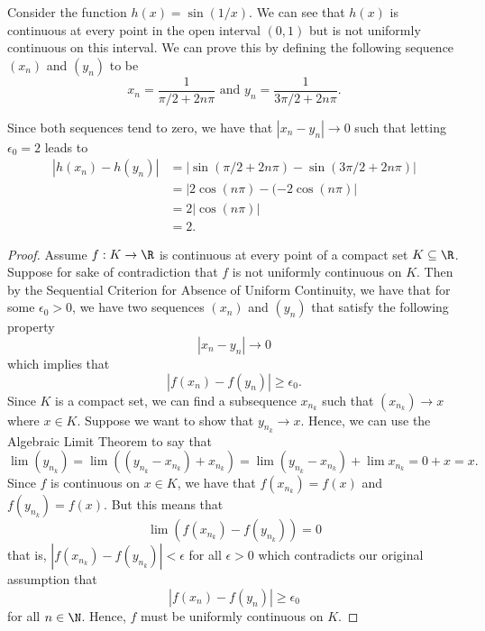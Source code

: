 \begin{example}{}{}
    Consider the function \( h(x) = \sin (1/x) \). We can see that \( h(x) \) is continuous at every point in the open interval \( (0,1) \) but is not uniformly continuous on this interval. We can prove this by defining the following sequence \( (x_n) \) and \( (y_n) \) to be 
    \[  x_n = \frac{ 1 }{ \pi / 2 + 2n \pi } \text{~and~} y_n = \frac{ 1 }{ 3\pi / 2 + 2n \pi }. \]
\end{example}
Since both sequences tend to zero, we have that \( | x_n - y_n | \to 0  \) such that letting \( \epsilon_0 = 2  \) leads to 
\begin{align*}
    | h(x_n) - h(y_n) | &= | \sin(\pi / 2 + 2n \pi ) - \sin( 3 \pi / 2 + 2n \pi)|  \\
                        &= | 2\cos(n \pi) - (-2\cos(n \pi)  | \\ 
                        &= 2 | \cos(n \pi) | \\  
                        &= 2.
\end{align*}



\begin{proof}
Assume \( f: K \to \R  \) is continuous at every point of a compact set \( K \subseteq \R  \). Suppose for sake of contradiction that \( f \) is not uniformly continuous on \( K \). Then by the Sequential Criterion for Absence of Uniform Continuity, we have that for some \( \epsilon_0 > 0  \), we have two sequences \( (x_n) \) and \( (y_n) \) that satisfy the following property 
\[  | x_n - y_n | \to 0  \] which implies that 
\[  | f(x_n) - f(y_n) | \geq \epsilon_0. \]
Since \( K  \) is a compact set, we can find a subsequence \( x_{n_k} \) such that \( (x_{n_k}) \to x  \) where \( x \in K  \). Suppose we want to show that \( y_{n_k} \to x  \). Hence, we can use the Algebraic Limit Theorem to say that 
\[ \lim (y_{n_k}) = \lim ((y_{n_k} - x_{n_k}) + x_{n_k}) = \lim (y_{n_k} - x_{n_k}) + \lim x_{n_k} = 0 + x = x.  \]
Since \( f \) is continuous on \( x \in K  \), we have that \( f(x_{n_k}) = f(x) \) and \( f(y_{n_k}) = f(x) \). But this means that 
\[ \lim (f(x_{n_k}) - f(y_{n_k})) = 0   \]
that is, \( | f(x_{n_k}) - f(y_{n_k})  | < \epsilon \)
for all \( \epsilon > 0  \)
which contradicts our original assumption that 
\[  | f(x_n) - f(y_n) | \geq \epsilon_0 \]
for all \( n \in \N  \). Hence, \( f \) must be uniformly continuous on \( K \).
\end{proof}



